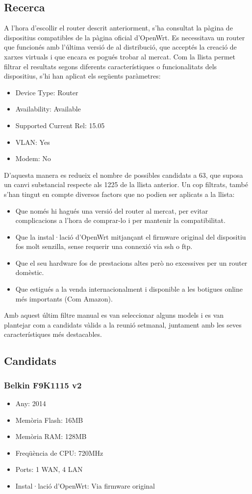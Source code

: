 \documentclass[11pt]{article}
\begin{document}
\subsection{Recerca}
A l’hora d’escollir el router descrit anteriorment, s’ha consultat la pàgina de dispositius compatibles de la pàgina oficial d’OpenWrt\cite{opens16}. Es necessitava un router que funcionés amb l’última versió de al distribució, que acceptés la creació de xarxes virtuals i que encara es pogués trobar al mercat. Com la llista permet filtrar el resultats segons diferents característiques o funcionalitats dels dispositius, s’hi han aplicat els següents paràmetres:
\begin{itemize}
\item Device Type: Router
\item Availability: Available
\item Supported Current Rel: 15.05
\item VLAN: Yes
\item Modem: No
\end{itemize}
D’aquesta manera es redueix el nombre de possibles candidats a 63, que suposa un canvi substancial respecte als 1225 de la llista anterior.
Un cop filtrats, també s’han tingut en compte diversos factors que no podien ser aplicats a la llista:
\begin{itemize}
\item Que només hi hagués una versió del router al mercat, per evitar complicacions a l’hora de comprar-lo i per mantenir la compatibilitat.
\item Que la instal·lació d’OpenWrt mitjançant el firmware original del dispositiu fos molt senzilla, sense requerir una connexió via ssh o ftp.
\item Que el seu hardware fos de prestacions altes però no excessives per un router domèstic.
\item Que estigués a la venda internacionalment i disponible a les botigues online més importants (Com Amazon).
\end{itemize}
Amb aquest últim filtre manual es van seleccionar alguns models i es van plantejar com a candidats vàlids a la reunió setmanal, juntament amb les seves característiques més destacables.
\newpage
\subsection{Candidats}
\subsubsection{Belkin F9K1115 v2}
\begin{itemize}
\item Any: 2014
\item Memòria Flash: 16MB
\item Memòria RAM: 128MB
\item Freqüència de CPU: 720MHz
\item Ports: 1 WAN, 4 LAN
\item Instal·lació d’OpenWrt: Via firmware original
\end{itemize}
\end{document}

